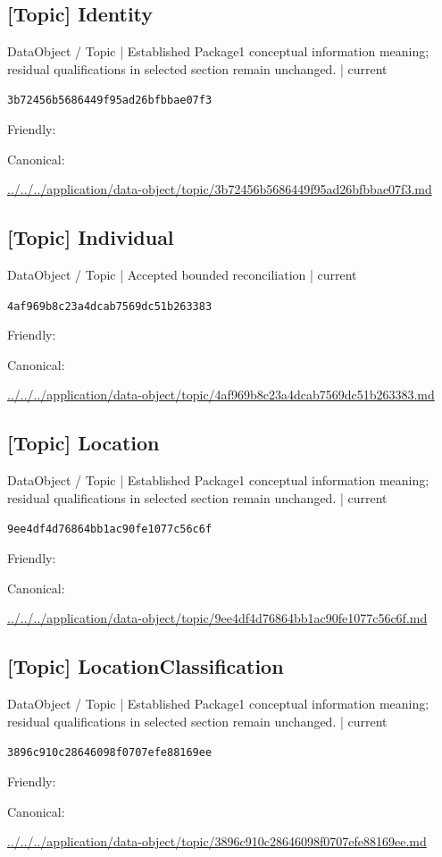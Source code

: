 \documentclass[10pt,a4paper]{article}
\begin{document}
\subsection*{[Topic] Identity}
{\small DataObject / Topic | Established Package1 conceptual information meaning; residual qualifications in selected section remain unchanged. | current}\par
\texttt{3b72456b5686449f95ad26bfbbae07f3}\par
Friendly: \par
Canonical: \par
{\footnotesize\url{../../../application/data-object/topic/3b72456b5686449f95ad26bfbbae07f3.md}}\par
\subsection*{[Topic] Individual}
{\small DataObject / Topic | Accepted bounded reconciliation | current}\par
\texttt{4af969b8c23a4dcab7569dc51b263383}\par
Friendly: \par
Canonical: \par
{\footnotesize\url{../../../application/data-object/topic/4af969b8c23a4dcab7569dc51b263383.md}}\par
\subsection*{[Topic] Location}
{\small DataObject / Topic | Established Package1 conceptual information meaning; residual qualifications in selected section remain unchanged. | current}\par
\texttt{9ee4df4d76864bb1ac90fe1077c56c6f}\par
Friendly: \par
Canonical: \par
{\footnotesize\url{../../../application/data-object/topic/9ee4df4d76864bb1ac90fe1077c56c6f.md}}\par
\subsection*{[Topic] LocationClassification}
{\small DataObject / Topic | Established Package1 conceptual information meaning; residual qualifications in selected section remain unchanged. | current}\par
\texttt{3896c910c28646098f0707efe88169ee}\par
Friendly: \par
Canonical: \par
{\footnotesize\url{../../../application/data-object/topic/3896c910c28646098f0707efe88169ee.md}}\par
\end{document}
